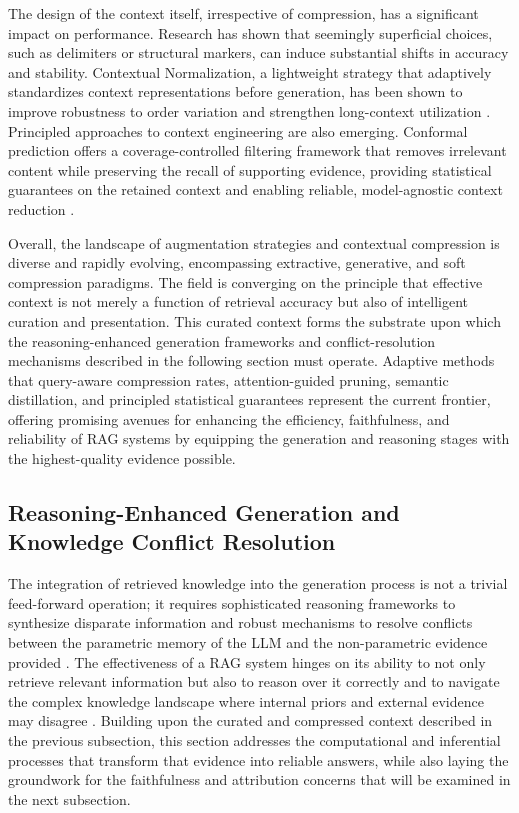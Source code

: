 \documentclass[11pt]{article}
\begin{document}
The design of the context itself, irrespective of compression, has a significant impact on performance. Research has shown that seemingly superficial choices, such as delimiters or structural markers, can induce substantial shifts in accuracy and stability. Contextual Normalization, a lightweight strategy that adaptively standardizes context representations before generation, has been shown to improve robustness to order variation and strengthen long-context utilization \cite{ref168}. Principled approaches to context engineering are also emerging. Conformal prediction offers a coverage-controlled filtering framework that removes irrelevant content while preserving the recall of supporting evidence, providing statistical guarantees on the retained context and enabling reliable, model-agnostic context reduction \cite{ref169}.

Overall, the landscape of augmentation strategies and contextual compression is diverse and rapidly evolving, encompassing extractive, generative, and soft compression paradigms. The field is converging on the principle that effective context is not merely a function of retrieval accuracy but also of intelligent curation and presentation. This curated context forms the substrate upon which the reasoning-enhanced generation frameworks and conflict-resolution mechanisms described in the following section must operate. Adaptive methods that query-aware compression rates, attention-guided pruning, semantic distillation, and principled statistical guarantees represent the current frontier, offering promising avenues for enhancing the efficiency, faithfulness, and reliability of RAG systems by equipping the generation and reasoning stages with the highest-quality evidence possible.

\subsection{Reasoning-Enhanced Generation and Knowledge Conflict Resolution}

The integration of retrieved knowledge into the generation process is not a trivial feed-forward operation; it requires sophisticated reasoning frameworks to synthesize disparate information and robust mechanisms to resolve conflicts between the parametric memory of the LLM and the non-parametric evidence provided \cite{ref170}. The effectiveness of a RAG system hinges on its ability to not only retrieve relevant information but also to reason over it correctly and to navigate the complex knowledge landscape where internal priors and external evidence may disagree \cite{ref171}. Building upon the curated and compressed context described in the previous subsection, this section addresses the computational and inferential processes that transform that evidence into reliable answers, while also laying the groundwork for the faithfulness and attribution concerns that will be examined in the next subsection.
\end{document}
